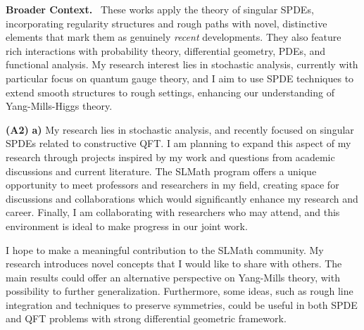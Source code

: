 \documentclass[./Research_statement.tex]{subfiles}
\begin{document}
\vspace{2pt}

\noindent \textbf{Broader Context.}\ 
%
%
These works apply the theory of singular SPDEs, incorporating regularity structures and rough paths with novel, distinctive elements that mark them as genuinely \textit{recent} developments. They also feature rich interactions with probability theory, differential geometry, PDEs, and functional analysis. My research interest lies in stochastic analysis, currently with particular focus on quantum gauge theory, and I aim to use SPDE techniques to extend smooth structures to rough settings, enhancing our understanding of Yang-Mills-Higgs theory. 
%
\newpage 

\noindent \textbf{(A2)} \textbf{a)} 
My research lies in stochastic analysis, and recently focused on singular SPDEs related to constructive QFT. I am planning to expand this aspect of my research through projects inspired by my work and  questions from academic discussions and current literature. The SLMath program offers a unique opportunity to meet professors and researchers in my field, creating space for discussions and collaborations which would significantly enhance my research and career. Finally, I am collaborating with researchers who may attend, and this environment is ideal to make progress in our joint work. 

I hope to make a meaningful contribution to the SLMath community. My research introduces novel concepts that I would like to share with others. The main results could offer an alternative perspective on Yang-Mills theory, with possibility to further generalization. Furthermore, some ideas, such as rough line integration and techniques to preserve symmetries, could be useful in both SPDE and QFT problems with strong differential geometric framework.



\end{document}
